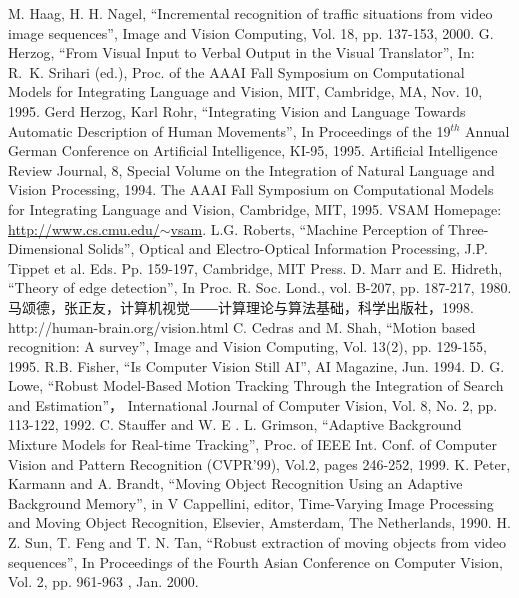 \begin{thebibliography}{200}
 M. Haag, H. H. Nagel, ``Incremental recognition of traffic situations from video image sequences'', Image and Vision Computing, Vol. 18, pp. 137-153, 2000.
 G. Herzog, ``From Visual Input to Verbal Output in the Visual Translator'', In: R.~K. Srihari (ed.), Proc. of the AAAI Fall Symposium on Computational Models for Integrating Language and Vision, MIT, Cambridge, MA, Nov. 10, 1995.
 Gerd Herzog, Karl Rohr, “Integrating Vision and Language Towards Automatic Description of Human Movements'', In Proceedings of the 19$^{th}$ Annual German Conference on Artificial Intelligence, KI-95, 1995.
 Artificial Intelligence Review Journal, 8, Special Volume on the Integration of Natural Language and Vision Processing, 1994.
 The AAAI Fall Symposium on Computational Models for Integrating Language and Vision, Cambridge, MIT, 1995.
 VSAM Homepage: \href{http://www.cs.cmu.edu/~vsam}{http://www.cs.cmu.edu/$\sim $vsam}.
 L.G. Roberts, ``Machine Perception of Three-Dimensional Solids'', Optical and Electro-Optical Information Processing, J.P. Tippet et al. Eds. Pp. 159-197, Cambridge, MIT Press.
 D. Marr and E. Hidreth, ``Theory of edge detection'', In Proc. R. Soc. Lond., vol. B-207, pp. 187-217, 1980.
 马颂德，张正友，计算机视觉――计算理论与算法基础，科学出版社，1998.
 http://human-brain.org/vision.html
 C. Cedras and M. Shah, ``Motion based recognition: A survey'', Image and Vision Computing, Vol. 13(2), pp. 129-155, 1995.
 R.B. Fisher, ``Is Computer Vision Still AI'', AI Magazine, Jun. 1994.
 D. G. Lowe, ``Robust Model-Based Motion Tracking Through the Integration of Search and Estimation''， International Journal of Computer Vision, Vol. 8, No. 2, pp. 113-122, 1992.
 C. Stauffer and W. E . L. Grimson, ``Adaptive Background Mixture Models for Real-time Tracking'', Proc. of IEEE Int. Conf. of Computer Vision and Pattern Recognition (CVPR'99), Vol.2, pages 246-252, 1999.
 K. Peter, Karmann and A. Brandt, ``Moving Object Recognition Using an Adaptive Background Memory”, in V Cappellini, editor, Time-Varying Image Processing and Moving Object Recognition, Elsevier, Amsterdam, The Netherlands, 1990.
 H. Z. Sun, T. Feng and T. N. Tan, ``Robust extraction of moving objects from video sequences'', In Proceedings of the Fourth Asian Conference on Computer Vision, Vol. 2, pp. 961-963 , Jan. 2000.

\end{thebibliography}
